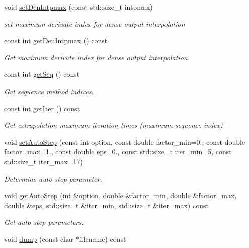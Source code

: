 \begin{DoxyCompactItemize}
void \hyperlink{classARC_1_1chainpars_ad6fdc240c5b14b28ec5d21e522c64c18}{set\+Den\+Intpmax} (const std\+::size\+\_\+t intpmax)
\begin{DoxyCompactList}\small\item\em set maximum derivate index for dense output interpolation \end{DoxyCompactList}\item 
const int \hyperlink{classARC_1_1chainpars_a6f3911d5f88ce35ae167f27fc96259c8}{get\+Den\+Intpmax} () const
\begin{DoxyCompactList}\small\item\em Get maximum derivate index for dense output interpolation. \end{DoxyCompactList}\item 
const int \hyperlink{classARC_1_1chainpars_af38efb14e24c1e85d48c8e6bbfa7479a}{get\+Seq} () const
\begin{DoxyCompactList}\small\item\em Get sequence method indices. \end{DoxyCompactList}\item 
const int \hyperlink{classARC_1_1chainpars_a12c79f1a146b4744460f3a21805cccd4}{get\+Iter} () const
\begin{DoxyCompactList}\small\item\em Get extrapolation maximum iteration times (maximum sequence index) \end{DoxyCompactList}\item 
void \hyperlink{classARC_1_1chainpars_a07a9734583565af190241ec32a6357c5}{set\+Auto\+Step} (const int option, const double factor\+\_\+min=0., const double factor\+\_\+max=1., const double eps=0., const std\+::size\+\_\+t iter\+\_\+min=5, const std\+::size\+\_\+t iter\+\_\+max=17)
\begin{DoxyCompactList}\small\item\em Determine auto-\/step parameter. \end{DoxyCompactList}\item 
void \hyperlink{classARC_1_1chainpars_a45191e5e22c1b080572b1ffc75f87c2c}{get\+Auto\+Step} (int \&option, double \&factor\+\_\+min, double \&factor\+\_\+max, double \&eps, std\+::size\+\_\+t \&iter\+\_\+min, std\+::size\+\_\+t \&iter\+\_\+max) const
\begin{DoxyCompactList}\small\item\em Get auto-\/step parameters. \end{DoxyCompactList}\item 
void \hyperlink{classARC_1_1chainpars_ad9b13829dde6cee409f807c2237e5dbd}{dump} (const char $\ast$filename) const

\end{DoxyCompactItemize}

